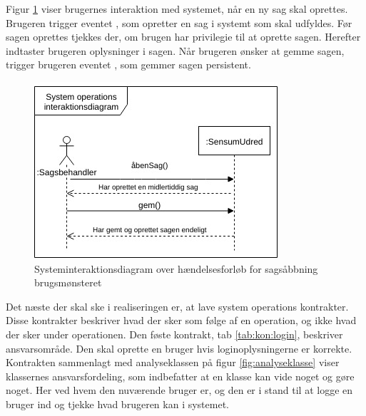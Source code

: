 \documentclass[../../main.tex]{subfiles}
\begin{document}
Figur \ref{fig:sags_aabning_interaktion} viser brugernes interaktion med systemet, når en ny sag skal oprettes. Brugeren trigger eventet , som opretter en sag i systemt som skal udfyldes. Før sagen oprettes tjekkes der, om brugen har privilegie til at oprette sagen. Herefter indtaster brugeren oplysninger i sagen. Når brugeren ønsker at gemme sagen, trigger brugeren eventet , som gemmer sagen persistent.

\begin{figure}[H]
  \centering
  \includegraphics[scale=.6]{figurer/Sags_aabning_interaktion.jpg}
  \caption{Systeminteraktionsdiagram over hændelsesforløb for sagsåbbning brugsmønsteret}
  \label{fig:sags_aabning_interaktion}
\end{figure}

Det næste der skal ske i realiseringen er, at lave system operations kontrakter. Disse kontrakter beskriver hvad der sker som følge af en operation, og ikke hvad der sker under operationen. Den føste kontrakt, tab \ref{tab:kon:login}, beskriver  ansvarsområde. Den skal oprette en bruger hvis loginoplysningerne er korrekte. Kontrakten sammenlagt med analyseklassen på figur \ref{fig:analyseklasse} viser klassernes ansvarsfordeling, som indbefatter at en klasse kan vide noget og gøre noget. Her ved  hvem den nuværende bruger er, og den er i stand til at logge en bruger ind og tjekke hvad brugeren kan i systemet. 
\end{document}
